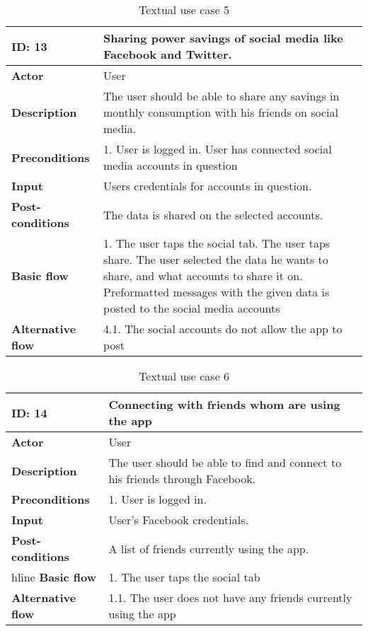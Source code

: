 \begin{table}[H]
\begin{tabular}{|l|p{11.7cm}|}
\hline
\textbf{ID: }13&\textbf{Sharing power savings of social media like Facebook and Twitter.}
\\\hline
\textbf{Actor} &User
\\\hline
\textbf{Description}&
The user should be able to share any savings in monthly consumption with his friends on social media.\\\hline
\textbf{Preconditions}&
1. User is logged in\newline
2. User has connected social media accounts in question\\\hline
\textbf{Input}&
Users credentials for accounts in question.\\\hline
\textbf{Post-conditions}& 
The data is shared on the selected accounts. \\\hline
\textbf{Basic flow}&
1. The user taps the social tab\newline
2. The user taps share\newline
3. The user selected the data he wants to share, and what accounts to share it on\newline
4. Preformatted messages with the given data is posted to the social media accounts
\\\hline
\textbf{Alternative flow}&
4.1. The social accounts do not allow the app to post
\\\hline
\end{tabular}
\caption{Textual use case 5}
\end{table}

\begin{table}[H]
\begin{tabular}{|l|p{11.7cm}|}
\hline
\textbf{ID: }14&\textbf{Connecting with friends whom are using the app}
\\\hline
\textbf{Actor} &User
\\\hline
\textbf{Description}&
The user should be able to find and connect to his friends through Facebook.\\\hline
\textbf{Preconditions}&
1. User is logged in.\\\hline
\textbf{Input}&
User's Facebook credentials.\\\hline
\textbf{Post-conditions}& 
A list of friends currently using the app.\\hline
\textbf{Basic flow}&
1. The user taps the social tab
\\\hline
\textbf{Alternative flow}&
1.1. The user does not have any friends currently using the app
\\\hline
\end{tabular}
\caption{Textual use case 6}
\end{table}


